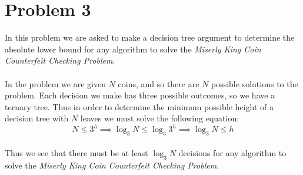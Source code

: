 \section*{Problem 3}

In this problem we are asked to make a decision tree argument to
determine the absolute lower bound for any algorithm to solve the 
\textit{Miserly King Coin Counterfeit Checking Problem}.
\\
\\
In the problem we are given $N$ coins, and so there are $N$ possible 
solutions to the problem. Each decision we make has three
possible outcomes, so we have a ternary tree. Thus in order to 
determine the minimum possible height of a decision tree with $N$
leaves we must solve the following equation:
\\
$$
N \leq 3^h \implies \log_3 N \leq \log_3 3^h \implies \log_3 N \leq h
$$
\\
Thus we see that there must be at least $\log_3 N$ decisions for any 
algorithm to solve the \textit{Miserly King Coin Counterfeit Checking 
Problem}.
